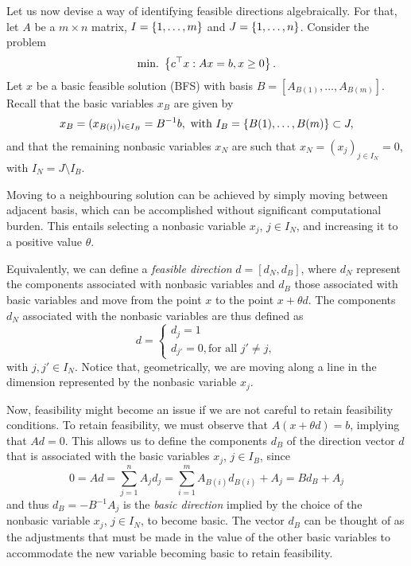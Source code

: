 Let us now devise a way of identifying feasible directions algebraically. For that, let $A$ be a $m \times n$ matrix, $I = \left\{ 1,\dots,m \right \}$ and $J = \left\{ 1,\dots,n \right \}$. Consider the problem 
%
\begin{equation*}
	\mathop{\text{min.~}} \left\{ c^\top x : Ax = b, x \geq 0 \right \}.	
\end{equation*}
%
Let $x$ be a basic feasible solution (BFS) with basis $B = [A_{B(1)}, \dots, A_{B(m)}]$. Recall that the basic variables $x_B$ are given by
%
\begin{equation*}
	x_B = (x_{B(i)})_{i \in I_B} = B^{-1}b, \text{ with } I_B = \left\{ B(1), \dots, B(m) \right \} \subset J,	
\end{equation*}
%
and that the remaining nonbasic variables $x_N$ are such that $x_N = (x_j)_{j \in I_N} = 0$, with $I_N = J \setminus I_B$.

Moving to a neighbouring solution can be achieved by simply moving between adjacent basis, which can be accomplished without significant computational burden. This entails selecting a nonbasic variable $x_j$, $j \in I_N$, and increasing it to a positive value $\theta$. 

Equivalently, we can define a \emph{feasible direction} $d = [d_N, d_B]$, where $d_N$ represent the components associated with nonbasic variables and $d_B$ those associated with basic variables and move from the point $x$ to the point $x + \theta d$. The components $d_N$ associated with the nonbasic variables are thus defined as 
%
\begin{equation*}
d = \begin{cases} d_j = 1 \\ 
				  d_{j'} = 0, \text{for all } j' \neq j, 
	\end{cases}	
\end{equation*}
%
with $j, j' \in I_N$. Notice that, geometrically, we are moving along a line in the dimension represented by the nonbasic variable $x_j$.

Now, feasibility might become an issue if we are not careful to retain feasibility conditions. To retain feasibility, we must observe that $A(x + \theta d) = b$, implying that $Ad = 0$. This allows us to define the components $d_B$ of the direction vector $d$ that is associated with the basic variables $x_j$, $j \in I_B$, since
%
\begin{equation*}
	0 = Ad = \sum_{j = 1}^n	A_j d_j = \sum_{i = 1}^m A_{B(i)}d_{B(i)} + A_j = Bd_B + A_j
\end{equation*}
%
and thus $d_B = -B^{-1} A_j$ is the \emph{basic direction} implied by the choice of the nonbasic variable $x_j$, $j \in I_N$, to become basic. The vector $d_B$ can be thought of as the adjustments that must be made in the value of the other basic variables to accommodate the new variable becoming basic to retain feasibility. 

